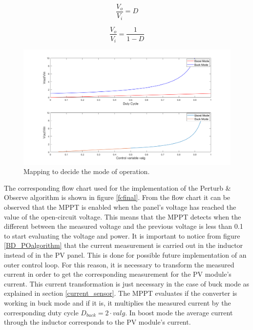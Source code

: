 \vspace{1cm}
\begin{minipage}{0.3\linewidth}
	\begin{equation}	\label{tfbuck}
	\frac{V_o}{V_i} = D
	\end{equation}

\end{minipage}%
\begin{minipage}{0.5\linewidth}	
	\begin{equation}	\label{tfboost}
	\frac{V_o}{V_i}= \frac{1}{1-D}
	\end{equation}

\end{minipage}

\begin{figure}[H]
	\begin{center}
		\includegraphics[width=1\textwidth]{../Pictures/decision_mode_operation}
		\caption{Mapping to decide the mode of operation.}
		\label{fig:mappingtf} 
	\end{center}	
\end{figure}


The corresponding flow chart used for the implementation of the Perturb \& Observe algorithm is shown in figure \ref{fcfinal}. From the flow chart it can be observed that the MPPT is enabled when the panel's voltage has reached the value of the open-circuit voltage. This means that the MPPT detects when the different between the measured voltage and the previous voltage is less than 0.1 to start evaluating the voltage and power.
It is important to notice from figure \ref{BD_POalgorithm} that the current measurement is carried out in the inductor instead of in the PV panel. This is done for possible future implementation of an outer control loop. For this reason, it is necessary to transform the measured current in order to get the corresponding measurement for the PV module's current. This current transformation is just necessary in the case of buck mode as explained in section \ref{current_sensor}. The MPPT evaluates if the converter is working in buck mode and if it is, it multiplies the measured current by the corresponding duty cycle $D_{buck}=2\cdot valg$. In boost mode the average current through the inductor corresponds to the PV module's current. 

